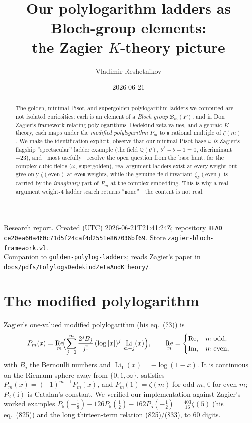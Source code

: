 \documentclass[11pt]{article}
\title{Our polylogarithm ladders as Bloch-group elements:\\ the Zagier $K$-theory picture}
\author{Vladimir Reshetnikov}
\date{2026-06-21}
\DeclareMathOperator{\Li}{Li}
\DeclareMathOperator{\Real}{Re}
\theoremstyle{plain}\newtheorem{theorem}{Theorem}\newtheorem{proposition}[theorem]{Proposition}
\theoremstyle{remark}\newtheorem{remark}[theorem]{Remark}
\begin{document}
\maketitle
\begin{center}\small
Research report. Created (UTC) 2026-06-21T21:41:24Z; repository \texttt{HEAD}
\texttt{ce20ea60a460c71d5f24caf4d2551e867036bf69}. Store \texttt{zagier-bloch-framework.wl}.\\
Companion to \texttt{golden-polylog-ladders}; reads Zagier's paper in
\texttt{docs/pdfs/PolylogsDedekindZetaAndKTheory/}.
\end{center}

\begin{abstract}
The golden, minimal-Pisot, and supergolden polylogarithm ladders we computed are not isolated curiosities: each is
an element of a \emph{Bloch group} $\mathcal B_m(F)$, and in Don Zagier's framework relating polylogarithms,
Dedekind zeta values, and algebraic $K$-theory, each maps under the \emph{modified polylogarithm} $P_m$ to a
rational multiple of $\zeta(m)$. We make the identification explicit, observe that our minimal-Pisot base
$\omega$ \emph{is} Zagier's flagship ``spectacular'' ladder example (the field $\mathbb Q(\theta)$,
$\theta^3-\theta-1=0$, discriminant $-23$), and---most usefully---resolve the open question from the base hunt: for
the complex cubic fields ($\omega$, supergolden), real-argument ladders exist at every weight but give only
$\zeta(\text{even})$ at even weights, while the genuine field invariant $\zeta_F(\text{even})$ is carried by the
\emph{imaginary} part of $P_m$ at the complex embedding. This is why a real-argument weight-$4$ ladder search
returns ``none''---the content is not real.
\end{abstract}

\section{The modified polylogarithm}
Zagier's one-valued modified polylogarithm (his eq.~(33)) is
\begin{equation}\label{eq:Pm}
  P_m(x)=\Real_m\!\Bigl(\sum_{j=0}^m \frac{2^j B_j}{j!}\,(\log|x|)^j\,\Li_{m-j}(x)\Bigr),\qquad
  \Real_m=\begin{cases}\Real,&m\text{ odd},\\ \operatorname{Im},&m\text{ even},\end{cases}
\end{equation}
with $B_j$ the Bernoulli numbers and $\Li_1(x)=-\log(1-x)$. It is continuous on the Riemann sphere away from
$\{0,1,\infty\}$, satisfies $P_m(\bar x)=(-1)^{m-1}P_m(x)$, and $P_m(1)=\zeta(m)$ for odd $m$, $0$ for even $m$;
$P_2(\mathrm i)$ is Catalan's constant. We verified our implementation against Zagier's worked examples
$P_5(-\tfrac18)-126P_5(\tfrac12)-162P_5(-\tfrac12)=\tfrac{403}{16}\zeta(5)$ (his eq.~(825)) and the long
thirteen-term relation (825)/(833), to $60$ digits.
\end{document}

